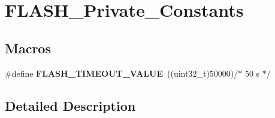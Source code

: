 \hypertarget{group___f_l_a_s_h___private___constants}{\section{F\-L\-A\-S\-H\-\_\-\-Private\-\_\-\-Constants}
\label{group___f_l_a_s_h___private___constants}
}
\subsection*{Macros}
\begin{DoxyCompactItemize}
\item 
\hypertarget{group___f_l_a_s_h___private___constants_ga76e8ea58ef37913dcdb61efae2d6ab8f}{\#define {\bfseries F\-L\-A\-S\-H\-\_\-\-T\-I\-M\-E\-O\-U\-T\-\_\-\-V\-A\-L\-U\-E}~((uint32\-\_\-t)50000)/$\ast$ 50 s $\ast$/}\label{group___f_l_a_s_h___private___constants_ga76e8ea58ef37913dcdb61efae2d6ab8f}

\end{DoxyCompactItemize}


\subsection{Detailed Description}

